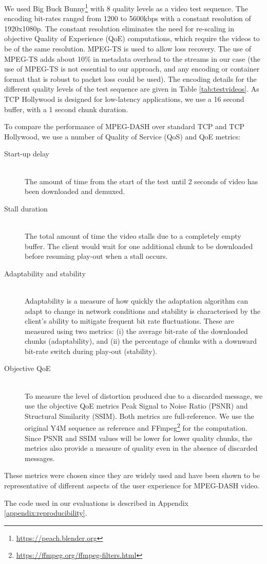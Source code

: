 We used Big Buck Bunny\footnote{\url{https://peach.blender.org}} with 8 quality levels as a video 
test sequence. The encoding bit-rates ranged from 1200 to 5600kbps with a constant resolution of 
1920x1080p. The constant resolution eliminates the need for re-scaling in objective Quality of 
Experience (QoE)
computations, which require the videos to be of the same resolution. MPEG-TS
is used to allow loss recovery. The use of MPEG-TS adds about
10\% in metadata overhead to the streams in our case (the use of MPEG-TS is not
essential to our approach, and any encoding or container format that is robust to packet loss
could be used). The encoding details for the different quality levels of
the test sequence are given in Table \ref{tab:testvideos}.
As TCP Hollywood is designed for low-latency applications, we use a 16 second buffer, with
a 1 second chunk duration.

To compare the performance of MPEG-DASH over standard TCP and TCP Hollywood, we use a number of 
Quality of Service (QoS) and QoE metrics: 
\begin{description}
    \item[Start-up delay] \hfill \\
        The amount of time from the start of the test until 2 seconds of video has been downloaded and demuxed.
    \item[Stall duration] \hfill \\
        The total amount of time the video stalls due to a completely empty buffer. The
        client would wait for one additional chunk to be downloaded before resuming play-out
        when a stall occurs.
    \item[Adaptability and stability] \hfill \\
        Adaptability is a measure of how quickly the adaptation algorithm can adapt to change in network conditions and stability is characterised by the client's ability to mitigate frequent bit rate fluctuations. These are measured using two metrics: (i) the average bit-rate of the downloaded chunks (adaptability), and (ii) the percentage of chunks with a downward bit-rate switch during play-out (stability).  
    \item[Objective QoE] \hfill \\
        To measure the level of distortion produced due to a discarded message, we use the 
        objective QoE metrics Peak Signal to Noise Ratio (PSNR) and Structural Similarity
        (SSIM). Both metrics are full-reference. We use the original Y4M sequence as
        reference and FFmpeg\footnote{\url{https://ffmpeg.org/ffmpeg-filters.html}} for the
        computation. Since PSNR and SSIM values will be lower for lower quality chunks, the
        metrics also provide a measure of quality even in the absence of discarded messages.
\end{description}

These metrics were chosen since they are widely used and have been shown to
be representative of different aspects of the user experience for MPEG-DASH
video.

The code used in our evaluations is described in Appendix \ref{appendix:reproducibility}.
